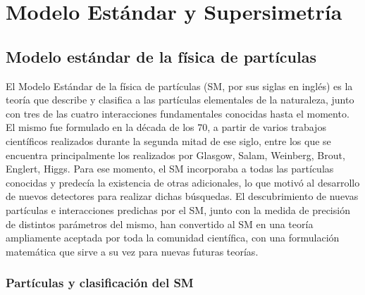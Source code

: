 \chapter{Modelo Estándar y Supersimetría}

\section{Modelo estándar de la física de partículas}

El Modelo Estándar de la física de partículas (SM, por sus siglas en inglés) es la teoría que describe y clasifica a las partículas elementales de la naturaleza, junto con tres de las cuatro interacciones fundamentales conocidas hasta el momento. El mismo fue formulado en la década de los 70, a partir de varios trabajos científicos realizados durante la segunda mitad de ese siglo, entre los que se encuentra principalmente los realizados por Glasgow, Salam, Weinberg, Brout, Englert, Higgs. Para ese momento, el SM incorporaba a todas las partículas conocidas y predecía la existencia de otras adicionales, lo que motivó al desarrollo de nuevos detectores para realizar dichas búsquedas. El descubrimiento de nuevas partículas e interacciones predichas por el SM, junto con la medida de precisión de distintos parámetros del mismo, han convertido al SM en una teoría ampliamente aceptada por toda la comunidad científica, con una formulación matemática que sirve a su vez para nuevas futuras teorías.

\subsection{Partículas y clasificación del SM}

